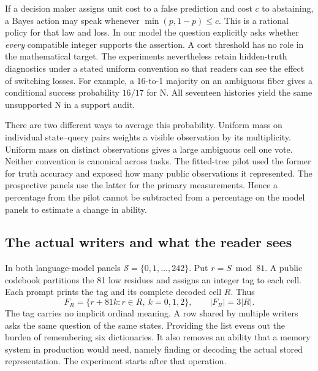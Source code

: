\documentclass[12pt,letterpaper]{article}
\begin{document}
If a decision maker assigns unit cost to a false prediction and cost $c$ to abstaining, a Bayes action may speak whenever $\min(p,1-p)\le c$. This is a rational policy for that law and loss. In our model the question explicitly asks whether \emph{every} compatible integer supports the assertion. A cost threshold has no role in the mathematical target. The experiments nevertheless retain hidden-truth diagnostics under a stated uniform convention so that readers can see the effect of switching losses. For example, a 16-to-1 majority on an ambiguous fiber gives a conditional success probability $16/17$ for N. All seventeen histories yield the same unsupported N in a support audit.

There are two different ways to average this probability. Uniform mass on individual state--query pairs weights a visible observation by its multiplicity. Uniform mass on distinct observations gives a large ambiguous cell one vote. Neither convention is canonical across tasks. The fitted-tree pilot used the former for truth accuracy and exposed how many public observations it represented. The prospective panels use the latter for the primary measurements. Hence a percentage from the pilot cannot be subtracted from a percentage on the model panels to estimate a change in ability.

\subsection{The actual writers and what the reader sees}
In both language-model panels $\mathcal S=\{0,1,\ldots,242\}$. Put $r=S\bmod81$. A public codebook partitions the 81 low residues and assigns an integer tag to each cell. Each prompt prints the tag and its complete decoded cell $R$. Thus
\[
 F_R=\{r+81k:r\in R,\ k=0,1,2\},\qquad |F_R|=3|R|.
\]
The tag carries no implicit ordinal meaning. A row shared by multiple writers asks the same question of the same states. Providing the list evens out the burden of remembering six dictionaries. It also removes an ability that a memory system in production would need, namely finding or decoding the actual stored representation. The experiment starts after that operation.
\end{document}

